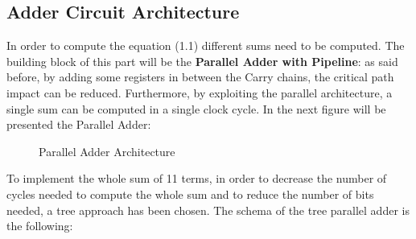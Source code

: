 \subsection{Adder Circuit Architecture}
In order to compute the equation (1.1) different sums need to be computed. The building block of this part will be the \textbf{Parallel Adder with Pipeline}: as said before, by adding some registers in between the Carry chains, the critical path impact can be reduced. Furthermore, by exploiting the parallel architecture, a single sum can be computed in a single clock cycle. In the next figure will be presented the Parallel Adder:
 \begin{figure}[H]
 	\centering
 	\caption{Parallel Adder Architecture}
 \end{figure}
To implement the whole sum of 11 terms, in order to decrease the number of cycles needed to compute the whole sum and to reduce the number of bits needed, a tree approach has been chosen. The schema of the tree parallel adder is the following:
